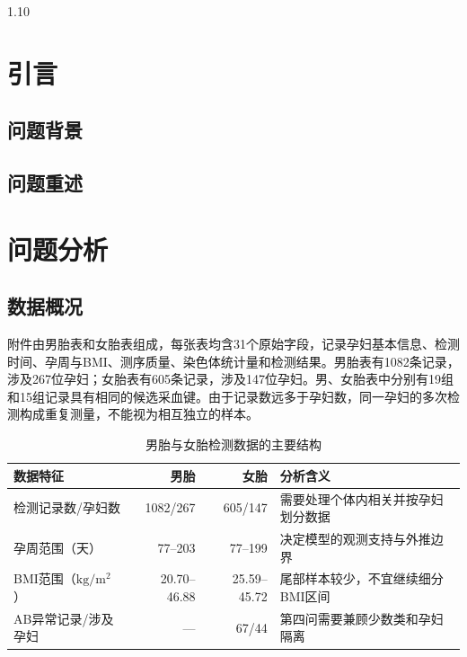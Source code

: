 \documentclass[12pt,a4paper]{ctexrep}
\numberwithin{equation}{section}
\newcommand{\song}{\songti}
\begin{document}
	
	\begin{spacing}{1.10}
		{\song{}
		\section{引言}
			\subsection{问题背景}
			\subsection{问题重述}
			
			\section{问题分析}
			\subsection{数据概况}

			附件由男胎表和女胎表组成，每张表均含31个原始字段，记录孕妇基本信息、检测时间、孕周与BMI、测序质量、染色体统计量和检测结果。男胎表有1082条记录，涉及267位孕妇；女胎表有605条记录，涉及147位孕妇。男、女胎表中分别有19组和15组记录具有相同的候选采血键。由于记录数远多于孕妇数，同一孕妇的多次检测构成重复测量，不能视为相互独立的样本。

			\begin{table}[htbp]
				\centering
				\caption{男胎与女胎检测数据的主要结构}
				\label{tab:data-overview}
				\small
				\renewcommand{\arraystretch}{1.15}
				\begin{tabularx}{\textwidth}{lrrX}
					\toprule
					数据特征 & 男胎 & 女胎 & 分析含义 \\
					\midrule
					检测记录数/孕妇数 & 1082/267 & 605/147 & 需要处理个体内相关并按孕妇划分数据 \\
					孕周范围（天） & 77--203 & 77--199 & 决定模型的观测支持与外推边界 \\
					BMI范围（$\mathrm{kg/m^2}$） & 20.70--46.88 & 25.59--45.72 & 尾部样本较少，不宜继续细分BMI区间 \\
					AB异常记录/涉及孕妇 & --- & 67/44 & 第四问需要兼顾少数类和孕妇隔离 \\
					\bottomrule
				\end{tabularx}
			\end{table}

}
\end{spacing}
\end{document}

